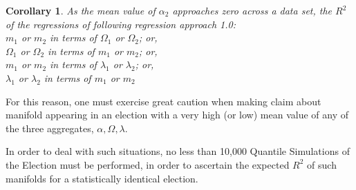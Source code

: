 \documentclass[preprint,13pt]{elsarticle}
\newtheorem{corollary}{Corollary}[theorem]
\begin{document}
\begin{corollary}
As the mean value of $\alpha_{2}$ approaches zero across a data set, the $R^2$ of the regressions of following regression approach 1.0:\\
$m_{1}$ or $m_{2}$ in terms of $\Omega_{1}$ or $\Omega_{2}$; or,\\
$\Omega_{1}$ or $\Omega_{2}$ in terms of $m_{1}$ or $m_{2}$; or,\\
$m_{1}$ or $m_{2}$ in terms of $\lambda_{1}$ or $\lambda_{2}$; or,\\
$\lambda_{1}$ or $\lambda_{2}$ in terms of $m_{1}$ or $m_{2}$
\end{corollary}

For this reason, one must exercise great caution when making claim about manifold appearing in an election with a very high (or low) mean value of any of the three aggregates, $\alpha, \Omega, \lambda$.

In order to deal with such situations, no less than 10,000 Quantile Simulations of the Election must be performed, in order to ascertain the expected $R^2$ of such manifolds for a statistically identical election.
\end{document}
